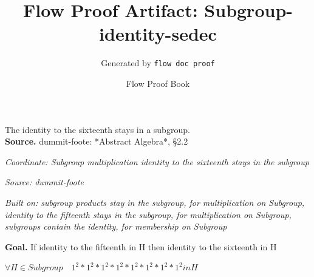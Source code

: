 \documentclass[11pt]{article}
\title{Flow Proof Artifact: Subgroup-identity-sedec}
\author{Generated by \texttt{flow doc proof}}
\date{Flow Proof Book}
\theoremstyle{definition}
\begin{document}
\maketitle
The identity to the sixteenth stays in a subgroup.\\[0.5em]
\textbf{Source.} dummit-foote: *Abstract Algebra*, §2.2\\[0.5em]
\bigskip
{}\par
\smallskip\noindent\textit{Coordinate: Subgroup \cdot multiplication \cdot identity to the sixteenth stays in the subgroup}\par
\smallskip\noindent\textit{Source: dummit-foote}\par
\smallskip\noindent\textit{Built on: subgroup products stay in the subgroup, for multiplication on Subgroup, identity to the fifteenth stays in the subgroup, for multiplication on Subgroup, subgroups contain the identity, for membership on Subgroup}\par
\medskip
\noindent\textbf{Goal.} If identity to the fifteenth in H then identity to the sixteenth in H\par
\noindent$\displaystyle \forall H \in Subgroup\quad 1^{2} * 1^{2} * 1^{2} * 1^{2} * 1^{2} * 1^{2} * 1^{2} * 1^{2} in H$\par
\medskip
\noindent
\end{document}
